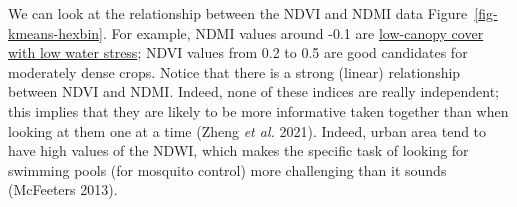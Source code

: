 \documentclass[
  letterpaper,
]{scrbook}
\begin{document}
We can look at the relationship between the NDVI and NDMI data
Figure~\ref{fig-kmeans-hexbin}. For example, NDMI values around -0.1 are
\href{https://eos.com/make-an-analysis/ndmi/}{low-canopy cover with low
water stress}; NDVI values from 0.2 to 0.5 are good candidates for
moderately dense crops. Notice that there is a strong (linear)
relationship between NDVI and NDMI. Indeed, none of these indices are
really independent; this implies that they are likely to be more
informative taken together than when looking at them one at a time
(Zheng \emph{et al.} 2021). Indeed, urban area tend to have high values
of the NDWI, which makes the specific task of looking for swimming pools
(for mosquito control) more challenging than it sounds (McFeeters 2013).

{
\makeatletter
\def\LT@makecaption#1#2#3{%
  \noalign{\smash{\hbox{\kern\textwidth\rlap{\kern\marginparsep
  \parbox[t]{\marginparwidth}{%
    \footnotesize{%
      \vspace{(1.1\baselineskip)}
    #1{#2: }\ignorespaces #3}}}}}}%
    }
\makeatother

\begin{figure}[bt]



\end{figure}%

}
\end{document}
